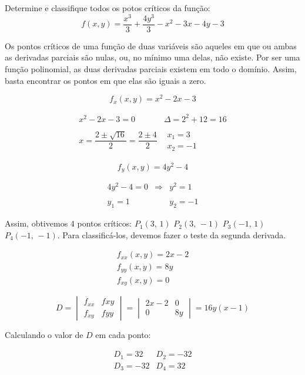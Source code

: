 \item Determine e classifique todos os potos críticos
da função:
$$f(x, y) = \frac{x^3}{3} + \frac{4y^3}{3} - x^2 - 3x - 4y - 3$$

\solucao

Os pontos críticos de uma função de duas variáveis são
aqueles em que ou ambas as derivadas parciais são nulas,
ou, no mínimo uma delas, não existe. Por ser uma função
polinomial, as duas derivadas parciais existem em todo o domínio.
Assim, basta encontrar os pontos em que elas são iguais a zero.

$$
f_x(x, y) = x^2 -2x -3
$$

$$
\begin{array}{cc}
	x^2 - 2x - 3 = 0 & \Delta = 2^2 + 12 = 16 \\ \\
	x = \dfrac{2 \pm \sqrt{16}}{2} = \dfrac{2 \pm 4}{2}
	&
	\begin{array}{c}
		x_1 = 3 \\ x_2 = -1
	\end{array}
\end{array}
$$

$$
f_y(x, y) = 4y^2 - 4
$$

$$
\begin{array}{ccc}
	4y^2 - 4 = 0  & \Rightarrow & y^2 = 1 \\ \\
	y_1 = 1 & & y_2 = -1
\end{array}
$$

Assim, obtivemos $4$ pontos críticos:
$P_1(3, \, 1)$ $P_2(3, \, -1)$ $P_3(-1, \, 1)$
$P_4(-1, \, -1)$. Para classificá-los, devemos fazer
o teste da segunda derivada.

$$
\begin{array}{c}
	f_{xx}(x, y) = 2x - 2\\
	f_{yy}(x, y) = 8y\\
	f_{xy}(x, y) = 0
\end{array}
$$

$$
D =
\begin{vmatrix}
	f_{xx} & f{xy} \\
	f_{xy} & f{yy}
\end{vmatrix}
=
\begin{vmatrix}
	2x - 2 & 0 \\
	0 & 8y
\end{vmatrix}
=
16y(x -1)
$$

Calculando o valor de $D$ em cada ponto:

$$
\begin{array}{cc}
	D_1 =  32 & D_2 = -32 \\
	D_3 = -32 & D_4 =  32
\end{array}
$$

